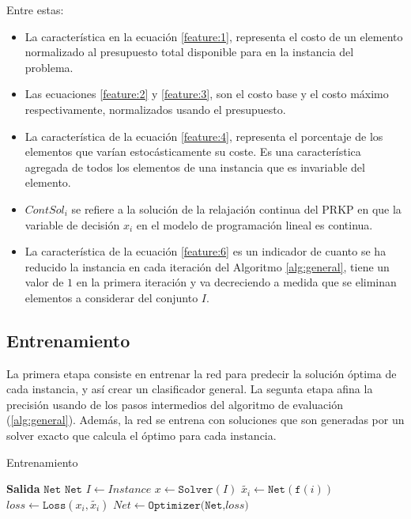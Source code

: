 \documentclass[spanish, a4paper, 12pt, openany,final]{book}
\begin{document}
Entre estas:
\begin{itemize}
	\item La característica en la ecuación \eqref{feature:1}, representa el costo de un elemento normalizado al presupuesto total disponible para en la instancia del problema.
	\item Las ecuaciones \eqref{feature:2} y \eqref{feature:3}, son el costo base y el costo máximo respectivamente, normalizados usando el presupuesto.
	\item La característica de la ecuación \eqref{feature:4}, representa el porcentaje de los elementos que varían estocásticamente su coste. Es una característica agregada de todos los elementos de una instancia que es invariable del elemento.
	
	\item $ContSol_i$ se refiere a la solución de la relajación continua del PRKP en que la variable de decisión $x_i$ en el modelo de programación lineal es continua.
	
	\item La característica de la ecuación \eqref{feature:6} es un indicador de cuanto se ha reducido la instancia en cada iteración del Algoritmo \ref{alg:general}, tiene un valor de $1$ en la primera iteración y va decreciendo a medida que se eliminan elementos a considerar del conjunto $I$.
	
\end{itemize}


\subsection{Entrenamiento}

La primera etapa consiste en entrenar la red para predecir la solución óptima de cada instancia, y así crear un clasificador general. La segunta etapa afina la precisión usando de los pasos intermedios del algoritmo de evaluación (\ref{alg:general}). Además, la red se entrena con soluciones que son generadas por un solver exacto que calcula el óptimo para cada instancia. 

\begin{algorithm}[H]
	\caption{Entrenamiento}\label{alg:training}
	\begin{algorithmic}[1]
		\Statex \textbf{Salida} $\texttt{Net}$
		\label{line:loss}
		\State $\texttt{Net}$ \label{line:def_net}
		   \label{line:startloop}
		\State $I \gets Instance$ \label{line:i_from_instance}
		\State $x \gets \texttt{Solver}(I)$\label{line:solveinstance}
		 \label{line:startinnerloop}
		\State $\tilde{x_i} \gets \texttt{Net}(\texttt{f}(i))$   \label{line:prediction}
		\State $loss \gets \texttt{Loss}(x_i,\tilde{x_i})$ \label{line:calculateloss}
		\State $Net \gets \texttt{Optimizer(Net,$loss$)}$ \label{line:optimizationstep}
		\EndFor \label{line:endinnerloop}
		\EndFor \label{line:endloop}
	\end{algorithmic}
\end{algorithm}
\end{document}

